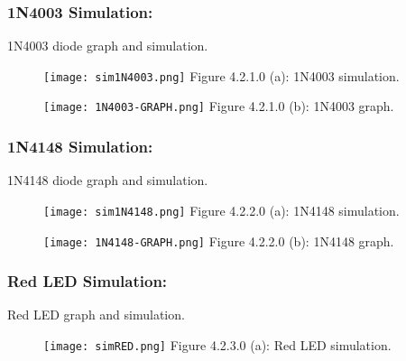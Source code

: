 \documentclass[10pt,a4paper]{article}
\begin{document}
\subsubsection{1N4003 Simulation:}

1N4003 diode graph and simulation.

\begin{figure}[H]
\texttt{[image: sim1N4003.png]}
\centering \linebreak \linebreak Figure 4.2.1.0 (a): 1N4003 simulation.
\end{figure}

\begin{figure}[H]
\texttt{[image: 1N4003-GRAPH.png]}
\centering \linebreak \linebreak Figure 4.2.1.0 (b): 1N4003 graph.
\end{figure}

\pagebreak

\subsubsection{1N4148 Simulation:}

1N4148 diode graph and simulation.

\begin{figure}[H]
\texttt{[image: sim1N4148.png]}
\centering \linebreak \linebreak Figure 4.2.2.0 (a): 1N4148 simulation.
\end{figure}

\begin{figure}[H]
\texttt{[image: 1N4148-GRAPH.png]}
\centering \linebreak \linebreak Figure 4.2.2.0 (b): 1N4148 graph.
\end{figure}

\pagebreak

\subsubsection{Red LED Simulation:}

Red LED graph and simulation.

\begin{figure}[H]
\texttt{[image: simRED.png]}
\centering \linebreak \linebreak Figure 4.2.3.0 (a): Red LED simulation.
\end{figure}
\end{document}
